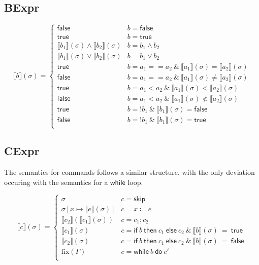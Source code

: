 \documentclass{lecturenotes}
\newcommand{\sem}[1]{\llbracket #1 \rrbracket}
\newcommand{\semapp}[2]{\sem{#1}(#2)}
\newcommand{\semappsig}[1]{\semapp{#1}{\sigma}}
\newcommand{\imp}[1]{\textsf{#1}}
\begin{document}
\subsection{BExpr}
\[
  \semappsig{b} = \begin{cases}
   \imp{false} & b = \imp{false}\\
   \imp{true}  & b = \imp{true}\\
    \semappsig{b_1} \wedge \semappsig{b_2} & b = b_1\wedge b_2\\
    \semappsig{b_1} \vee \semappsig{b_2} & b = b_1\vee b_2\\
   \imp{true} & b = a_1 == a_2~\&~\semappsig{a_1} = \semappsig{a_2}\\
   \imp{false} & b = a_1 == a_2~\&~\semappsig{a_1} \ne \semappsig{a_2}\\
   \imp{true} & b = a_1 < a_2~\&~\semappsig{a_1} < \semappsig{a_2}\\
   \imp{false} & b = a_1 < a_2~\&~\semappsig{a_1} \nless \semappsig{a_2}\\
   \imp{true} & b = !b_1~\&~\semappsig{b_1} = \imp{false}\\
   \imp{false} & b = !b_1~\&~\semappsig{b_1} = \imp{true}\\
  \end{cases}
\]

\subsection{CExpr}
The semantics for commands follows a similar structure, with the only deviation occuring with the semantics for a $\imp{while}$ loop.

\[
  \semappsig{c} = \begin{cases}
    \sigma & c = \imp{skip}\\
    \sigma[x \mapsto \semappsig{e}]  & c = x \coloneq e \\
    \semapp{c_2}{\semappsig{c_1}} & c = c_1; c_2\\
    \sem{c_1}(\sigma) & c = \imp{if}~b~\imp{then}~c_1~\imp{else}~c_2~\&~\sem{b}(\sigma)~=~\imp{true}\\
    \sem{c_2}(\sigma) & c = \imp{if}~b~\imp{then}~c_1~\imp{else}~c_2~\&~\sem{b}(\sigma)~=~\imp{false}\\
    \text{fix}(\Gamma) & c = \imp{while}~b~\imp{do}~c'\\
  \end{cases}
\]
\end{document}
